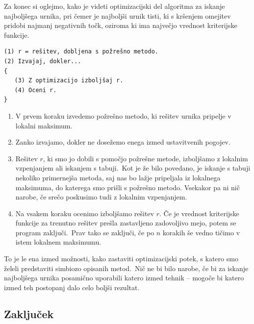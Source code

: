 \documentclass[a4paper]{article}
\begin{document}
Za konec si oglejmo, kako je videti optimizacijski del algoritma za iskanje najboljšega
urnika, pri čemer je najboljši urnik tisti, ki s kršenjem omejitev pridobi najmanj negativnih
točk, oziroma ki ima največjo vrednost kriterijske funkcije.

\begin{verbatim}
(1) r = rešitev, dobljena s požrešno metodo.
(2) Izvajaj, dokler...
{
   (3) Z optimizacijo izboljšaj r.
   (4) Oceni r.
}
\end{verbatim}

\begin{enumerate}
	\item V prvem koraku izvedemo požrešno metodo, ki rešitev urnika pripelje v lokalni maksimum.

   \item Zanko izvajamo, dokler ne dosežemo enega izmed ustavitvenih pogojev.

   \item Rešitev $r$, ki smo jo dobili s pomočjo požrešne metode, izboljšamo z lokalnim vzpenjanjem
   ali iskanjem s tabuji.\ Kot je že bilo povedano, je iskanje s tabuji nekoliko primernejša metoda,
   saj nas bo lažje pripeljala iz lokalnega maksimuma, do katerega smo prišli s požrešno metodo.
   Vsekakor pa ni nič narobe, če srečo poskusimo tudi z lokalnim vzpenjanjem.

  \item Na vsakem koraku ocenimo izboljšamo rešitev $r$. Če je vrednost kriterijske funkcije
    za trenutno rešitev prešla zastavljeno zadovoljivo mejo, potem se program zaključi.\ Prav tako
   se zaključi, če po $n$ korakih še vedno tičimo v istem lokalnem maksimumu.

\end{enumerate}
To je le ena izmed možnosti, kako zastaviti optimizacijski potek, s katero smo želeli predstaviti
simbiozo opisanih metod.\ Nič ne bi bilo narobe, če bi za iskanje najboljšega urnika posamično
uporabili katero izmed tehnik -- mogoče bi katero izmed teh postopanj dalo celo boljši rezultat.

\subsection{Zaključek} %
\end{document}
